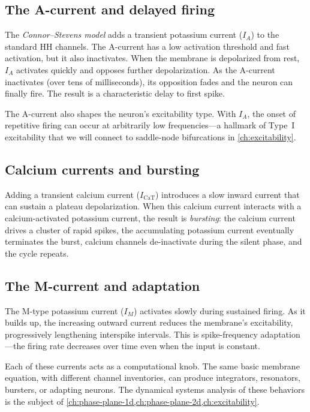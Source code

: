 \subsection{The A-current and delayed firing}

The \emph{Connor--Stevens model} adds a transient potassium current ($I_A$) to the standard HH channels. The A-current has a low activation threshold and fast activation, but it also inactivates. When the membrane is depolarized from rest, $I_A$ activates quickly and opposes further depolarization. As the A-current inactivates (over tens of milliseconds), its opposition fades and the neuron can finally fire. The result is a characteristic delay to first spike.

The A-current also shapes the neuron's excitability type. With $I_A$, the onset of repetitive firing can occur at arbitrarily low frequencies---a hallmark of Type~I excitability that we will connect to saddle-node bifurcations in \cref{ch:excitability}.

\subsection{Calcium currents and bursting}

Adding a transient calcium current ($I_{\text{CaT}}$) introduces a slow inward current that can sustain a plateau depolarization. When this calcium current interacts with a calcium-activated potassium current, the result is \emph{bursting}: the calcium current drives a cluster of rapid spikes, the accumulating potassium current eventually terminates the burst, calcium channels de-inactivate during the silent phase, and the cycle repeats.

\subsection{The M-current and adaptation}

The M-type potassium current ($I_M$) activates slowly during sustained firing. As it builds up, the increasing outward current reduces the membrane's excitability, progressively lengthening interspike intervals. This is spike-frequency adaptation---the firing rate decreases over time even when the input is constant.

Each of these currents acts as a computational knob. The same basic membrane equation, with different channel inventories, can produce integrators, resonators, bursters, or adapting neurons. The dynamical systems analysis of these behaviors is the subject of \cref{ch:phase-plane-1d,ch:phase-plane-2d,ch:excitability}.


